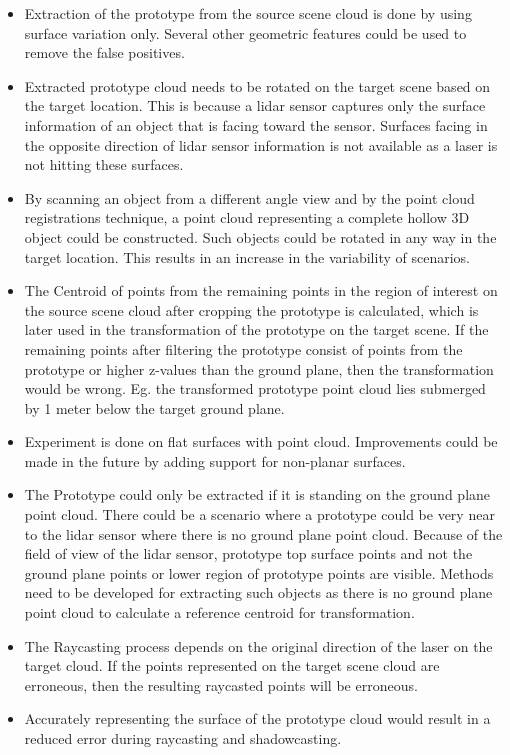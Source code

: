 \begin{itemize}
    \item Extraction of the prototype from the source scene cloud is done by using surface variation only. Several other geometric features could be used to remove the false positives.
    \item Extracted prototype cloud needs to be rotated on the target scene based on the target location. This is because a lidar sensor captures only the surface information of an object that is facing toward the sensor. Surfaces facing in the opposite direction of lidar sensor information is not available as a laser is not hitting these surfaces.
    \item By scanning an object from a different angle view and by the point cloud registrations technique, a point cloud representing a complete hollow 3D object could be constructed. Such objects could be rotated in any way in the target location. This results in an increase in the variability of scenarios.
    \item The Centroid of points from the remaining points in the region of interest on the source scene cloud after cropping the prototype is calculated, which is later used in the transformation of the prototype on the target scene. If the remaining points after filtering the prototype consist of points from the prototype or higher z-values than the ground plane, then the transformation would be wrong. Eg. the transformed prototype point cloud lies submerged by 1 meter below the target ground plane.
    \item Experiment is done on flat surfaces with point cloud. Improvements could be made in the future by adding support for non-planar surfaces.
    \item The Prototype could only be extracted if it is standing on the ground plane point cloud. There could be a scenario where a prototype could be very near to the lidar sensor where there is no ground plane point cloud. Because of the field of view of the lidar sensor, prototype top surface points and not the ground plane points or lower region of prototype points are visible. Methods need to be developed for extracting such objects as there is no ground plane point cloud to calculate a reference centroid for transformation.
    \item The Raycasting process depends on the original direction of the laser on the target cloud. If the points represented on the target scene cloud are erroneous, then the resulting raycasted points will be erroneous.
    \item Accurately representing the surface of the prototype cloud would result in a reduced error during raycasting and shadowcasting.

\end{itemize}
